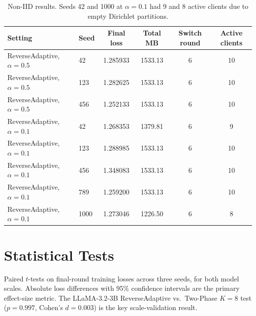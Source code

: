 \begin{table}[H]
\caption{Non-IID results. Seeds 42 and 1000 at $\alpha{=}0.1$ had 9 and 8 active clients due to empty Dirichlet partitions.}
\label{tab:b2}
\begin{center}
\small
\begin{tabular}{llcccc}
\toprule
Setting & Seed & Final loss & Total MB & Switch round & Active clients \\
\midrule
ReverseAdaptive, $\alpha{=}0.5$ & 42 & 1.285933 & 1533.13 & 6 & 10 \\
ReverseAdaptive, $\alpha{=}0.5$ & 123 & 1.282625 & 1533.13 & 6 & 10 \\
ReverseAdaptive, $\alpha{=}0.5$ & 456 & 1.252133 & 1533.13 & 6 & 10 \\
ReverseAdaptive, $\alpha{=}0.1$ & 42 & 1.268353 & 1379.81 & 6 & 9 \\
ReverseAdaptive, $\alpha{=}0.1$ & 123 & 1.288985 & 1533.13 & 6 & 10 \\
ReverseAdaptive, $\alpha{=}0.1$ & 456 & 1.348083 & 1533.13 & 6 & 10 \\
ReverseAdaptive, $\alpha{=}0.1$ & 789 & 1.259200 & 1533.13 & 6 & 10 \\
ReverseAdaptive, $\alpha{=}0.1$ & 1000 & 1.273046 & 1226.50 & 6 & 8 \\
\bottomrule
\end{tabular}
\end{center}
\end{table}

\section{Statistical Tests}
\label{app:stats}
Paired $t$-tests on final-round training losses across three seeds, for both model scales. Absolute loss differences with 95\% confidence intervals are the primary effect-size metric. The LLaMA-3.2-3B ReverseAdaptive vs.\ Two-Phase $K{=}8$ test ($p = 0.997$, Cohen's $d = 0.003$) is the key scale-validation result.

